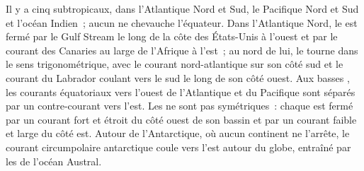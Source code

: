 Il y a cinq  subtropicaux, dans l'Atlantique Nord et Sud, le Pacifique Nord et
Sud et l'océan Indien~; aucun ne chevauche l'équateur. Dans l'Atlantique
Nord, le  est fermé par le Gulf Stream le long de la côte des
États-Unis à l'ouest et par le courant des Canaries au large de l'Afrique à l'est~; au nord
de lui, le  tourne dans le sens trigonométrique, avec le courant nord-atlantique sur son
côté sud et le courant du Labrador coulant vers le sud le long de son côté ouest. Aux basses
, les courants équatoriaux vers l'ouest de l'Atlantique et du Pacifique sont
séparés par un contre-courant vers l'est. Les  ne sont pas symétriques~: chaque  est
fermé par un courant fort et étroit du côté ouest de son bassin et par un courant faible et
large du côté est. Autour de l'Antarctique, où aucun continent ne l'arrête,
le courant circumpolaire antarctique coule vers l'est autour du globe, entraîné par les
 de l'océan Austral.

